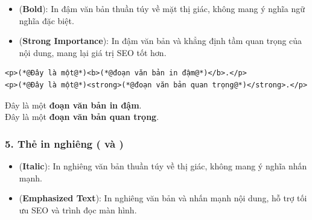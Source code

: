 \begin{itemize}[leftmargin=1.8em, itemsep=3pt, parsep=0pt]
    \item {} (\textbf{Bold}): In đậm văn bản thuần túy về mặt thị giác, không mang ý nghĩa ngữ nghĩa đặc biệt.
    \item {} (\textbf{Strong Importance}): In đậm văn bản và khẳng định tầm quan trọng của nội dung, mang lại giá trị SEO tốt hơn.
\end{itemize}

\begin{codeWindow}
\begin{lstlisting}[language=HTML5]
<p>(*@Đây là một@*)<b>(*@đoạn văn bản in đậm@*)</b>.</p>
<p>(*@Đây là một@*)<strong>(*@đoạn văn bản quan trọng@*)</strong>.</p>
\end{lstlisting}
\end{codeWindow}
\begin{tcolorbox}[
    enhanced,
    colback=white,
    colframe=primaryBlue!20,
    arc=6pt,
    boxrule=0.8pt,
    drop shadow=black!3!white,
    top=8pt, bottom=8pt, left=12pt, right=12pt,
    title={\sffamily\bfseries\scriptsize\color{codeComment} KẾT QUẢ HIỂN THỊ TRÊN TRÌNH DUYỆT (BROWSER PREVIEW)},
    coltitle=codeComment,
    colbacktitle=codeBg!80!white
]
Đây là một \textbf{đoạn văn bản in đậm}.\\[3pt]
Đây là một \textbf{đoạn văn bản quan trọng}.
\end{tcolorbox}


\subsubsection{5. Thẻ in nghiêng ( và )}

\begin{itemize}[leftmargin=1.8em, itemsep=3pt, parsep=0pt]
    \item {} (\textbf{Italic}): In nghiêng văn bản thuần túy về thị giác, không mang ý nghĩa nhấn mạnh.
    \item {} (\textbf{Emphasized Text}): In nghiêng văn bản và nhấn mạnh nội dung, hỗ trợ tối ưu SEO và trình đọc màn hình.
\end{itemize}

